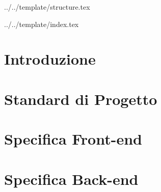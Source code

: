 


\def\DOCUMENTO{Definizione di Prodotto}
\def\VERSIONE{1.0.0}

\def\DESCRIZIONE{Documento che definisce in dettaglio l'architettura del prodotto \PROGETTO.}

\def\REDATTORE {Burlin Valerio \\ & Carraro Nicola \\ & Crespan Emanuele \\ & Ros Fabio}
\def\VERIFICATORE {Agostinetto Matteo}
\def\RESPONSABILE {Suierica Bogdan}

\def\USO {Esterno}

\def\DISTRIBUZIONE {\GRUPPO{}\\ & \COMMITTENTE{}\\ & \PROPONENTE{}\\}

\def\DESCRIZIONE {Documento che definisce in dettaglio l'architettura del prodotto \PROGETTO.}

\def\SCOPE {\textit{\$scope}}


\def\INDICE	{true}
\def\TABELLE {true}
\def\FIGURE {true}


 {../../template/structure.tex}


 {../../template/index.tex}


\section{Introduzione}

\newpage
\section{Standard di Progetto}

\newpage
\section{Specifica Front-end}

\newpage
\section{Specifica Back-end}

\newpage




